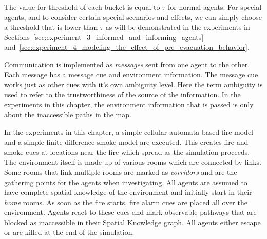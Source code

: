 The value for threshold of each bucket is equal to $\tau$ for normal agents. For special agents, and to consider certain special scenarios and effects, we can simply choose a threshold that is lower than $\tau$ as will be demonstrated in the experiments in Sections~\ref{sec:experiment_3_informed_and_informing_agents} and~\ref{sec:experiment_4_modeling_the_effect_of_pre_evacuation_behavior}.


Communication is implemented as \emph{messages} sent from one agent to the other. Each message has a message cue and environment information. The message cue works just as other cues with it's own ambiguity level. Here the term ambiguity is used to refer to the trustworthiness of the source of the information. In the experiments in this chapter, the environment information that is passed is only about the inaccessible paths in the map.

In the experiments in this chapter, a simple cellular automata based fire model and a simple finite difference smoke model are executed. This creates fire and smoke cues at locations near the fire which spread as the simulation proceeds. The environment itself is made up of various rooms which are connected by links. Some rooms that link multiple rooms are marked as \emph{corridors} and are the gathering points for the agents when investigating. All agents are assumed to have complete spatial knowledge of the environment and initially start in their \emph{home} rooms. As soon as the fire starts, fire alarm cues are placed all over the environment. Agents react to these cues and mark observable pathways that are blocked as inaccessible in their Spatial Knowledge graph. All agents either escape or are killed at the end of the simulation.





